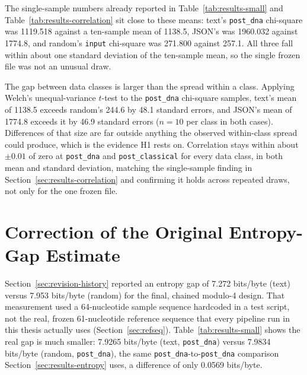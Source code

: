 \documentclass[12pt,a4paper,twoside]{report}
\numberwithin{equation}{chapter}
\begin{document}
The single-sample numbers already reported in Table~\ref{tab:results-small}
and Table~\ref{tab:results-correlation} sit close to these means: text's
\texttt{post\_dna} chi-square was 1119.518 against a ten-sample mean of
1138.5, JSON's was 1960.032 against 1774.8, and random's \texttt{input}
chi-square was 271.800 against 257.1. All three fall within about one
standard deviation of the ten-sample mean, so the single frozen file was
not an unusual draw.

The gap between data classes is larger than the spread within a class.
Applying Welch's unequal-variance $t$-test to the \texttt{post\_dna}
chi-square samples, text's mean of 1138.5 exceeds random's 244.6 by
48.1 standard errors, and JSON's mean of 1774.8 exceeds it by 46.9
standard errors ($n=10$ per class in both cases). Differences of that
size are far outside anything the observed within-class spread could
produce, which is the evidence H1 rests on.
Correlation stays within about
$\pm 0.01$ of zero at \texttt{post\_dna} and \texttt{post\_classical} for
every data class, in both mean and standard deviation, matching the
single-sample finding in Section~\ref{sec:results-correlation} and
confirming it holds across repeated draws, not only for the one frozen
file.

\section{Correction of the Original Entropy-Gap Estimate}
\label{sec:results-correction}
Section~\ref{sec:revision-history} reported an entropy gap of 7.272
bits/byte (text) versus 7.953 bits/byte (random) for the final,
chained modulo-4 design. That measurement used a 64-nucleotide sample
sequence hardcoded in a test script, not the real, frozen 61-nucleotide
reference sequence that every pipeline run in this thesis actually uses
(Section~\ref{sec:refseq}). Table~\ref{tab:results-small} shows the
real gap is much smaller: 7.9265 bits/byte (text, \texttt{post\_dna})
versus 7.9834 bits/byte (random, \texttt{post\_dna}), the same
\texttt{post\_dna}-to-\texttt{post\_dna} comparison Section~\ref{sec:results-entropy}
uses, a difference of only 0.0569 bits/byte.
\end{document}
